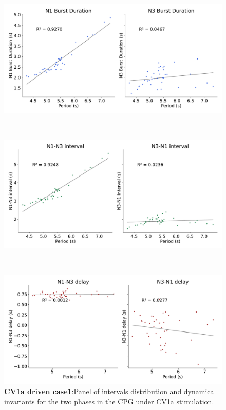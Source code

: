 \begin{figure}[htbp]
\begin{minipage}[b]{0.55\textwidth}
		\begin{minipage}[b]{\textwidth}
			\centering
			\includegraphics[width=\textwidth]{./invariants/data/SUSSEX/CV1a_driven1/images/stim_cv1a1_durations.pdf}
		\end{minipage}\\
		\begin{minipage}[b]{\textwidth}
			\centering
			\includegraphics[width=\textwidth]{./invariants/data/SUSSEX/CV1a_driven1/images/stim_cv1a1_intervals.pdf}
		\end{minipage}\\
		\begin{minipage}[b]{\textwidth}
			\centering
			\includegraphics[width=\textwidth]{./invariants/data/SUSSEX/CV1a_driven1/images/stim_cv1a1_delays.pdf}
		\end{minipage}
	\end{minipage}
	\caption{\textbf{CV1a driven case1}:Panel of intervals distribution and dynamical invariants for the two phases in the CPG under CV1a stimulation.}
	\label{fig:cv1a 1 2phases}
\end{figure}





